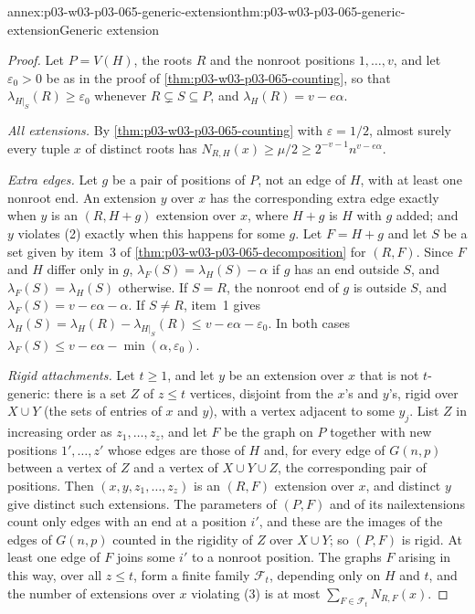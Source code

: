 \begin{annexitem}{annex:p03-w03-p03-065-generic-extension}{thm:p03-w03-p03-065-generic-extension}{Generic extension}
\begin{proof}
Let \(P=V(H)\), the roots \(R\) and the nonroot positions
\(1,\ldots,v\), and let \(\varepsilon_0>0\) be as in the proof of
\cref{thm:p03-w03-p03-065-counting}, so that
\(\lambda_{H|_{S}}(R)\geq\varepsilon_0\) whenever \(R\subsetneq S\subseteq
P\), and \(\lambda_H(R)=v-e\alpha\).

\emph{All extensions.}  By \cref{thm:p03-w03-p03-065-counting} with
\(\varepsilon=1/2\), almost surely every tuple \(x\) of distinct roots has
\(N_{R,H}(x)\geq\mu/2\geq2^{-v-1}n^{v-e\alpha}\).

\emph{Extra edges.}  Let \(g\) be a pair of positions of \(P\), not an edge
of \(H\), with at least one nonroot end.  An extension \(y\) over \(x\) has
the corresponding extra edge exactly when \(y\) is an \((R,H+g)\) extension
over \(x\), where \(H+g\) is \(H\) with \(g\) added; and \(y\) violates (2)
exactly when this happens for some \(g\).  Let \(F=H+g\) and let \(S\) be a
set given by item~3 of \cref{thm:p03-w03-p03-065-decomposition} for
\((R,F)\).  Since \(F\) and \(H\) differ only in \(g\),
\(\lambda_F(S)=\lambda_H(S)-\alpha\) if \(g\) has an end outside \(S\), and
\(\lambda_F(S)=\lambda_H(S)\) otherwise.  If \(S=R\), the nonroot end of \(g\)
is outside \(S\), and \(\lambda_F(S)=v-e\alpha-\alpha\).  If \(S\neq R\),
item~1 gives \(\lambda_H(S)=\lambda_H(R)-\lambda_{H|_S}(R)\leq
v-e\alpha-\varepsilon_0\).  In both cases
\(\lambda_F(S)\leq v-e\alpha-\min(\alpha,\varepsilon_0)\).

\emph{Rigid attachments.}  Let \(t\geq1\), and let \(y\) be an extension
over \(x\) that is not \(t\)-generic: there is a set \(Z\) of
\(z\leq t\) vertices, disjoint from the \(x\)'s and \(y\)'s, rigid over
\(X\cup Y\) (the sets of entries of \(x\) and \(y\)), with a vertex adjacent
to some \(y_j\).  List \(Z\) in increasing order as \(z_1,\ldots,z_z\), and
let \(F\) be the graph on \(P\) together with new positions \(1',\ldots,z'\)
whose edges are those of \(H\) and, for every edge of \(G(n,p)\) between a
vertex of \(Z\) and a vertex of \(X\cup Y\cup Z\), the corresponding pair of
positions.  Then \((x,y,z_1,\ldots,z_z)\) is an \((R,F)\) extension over
\(x\), and distinct \(y\) give distinct such extensions.  The parameters of
\((P,F)\) and of its nailextensions count only edges with an end at a
position \(i'\), and these are the images of the edges of \(G(n,p)\) counted
in the rigidity of \(Z\) over \(X\cup Y\); so \((P,F)\) is rigid.  At least
one edge of \(F\) joins some \(i'\) to a nonroot position.  The graphs \(F\)
arising in this way, over all \(z\leq t\), form a finite family
\(\mathcal F_t\), depending only on \(H\) and \(t\), and the number of
extensions over \(x\) violating (3) is at most
\(\sum_{F\in\mathcal F_t}N_{R,F}(x)\).


\end{proof}
\end{annexitem}
